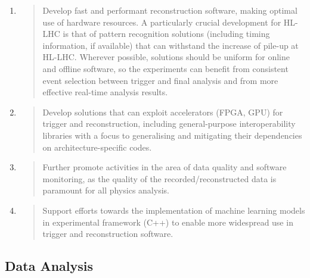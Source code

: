 \documentclass[11pt,a4paper]{article}
\begin{document}
\begin{enumerate}
\def\labelenumi{\arabic{enumi}.}
\item
  \begin{quote}
  Develop fast and performant reconstruction software, making optimal
  use of hardware resources. A particularly crucial development for
  HL-LHC is that of pattern recognition solutions (including timing
  information, if available) that can withstand the increase of pile-up
  at HL-LHC. Wherever possible, solutions should be uniform for online
  and offline software, so the experiments can benefit from consistent
  event selection between trigger and final analysis and from more
  effective real-time analysis results.
  \end{quote}
\item
  \begin{quote}
  Develop solutions that can exploit accelerators (FPGA, GPU) for
  trigger and reconstruction, including general-purpose interoperability
  libraries with a focus to generalising and mitigating their
  dependencies on architecture-specific codes.
  \end{quote}
\item
  \begin{quote}
  Further promote activities in the area of data quality and software
  monitoring, as the quality of the recorded/reconstructed data is
  paramount for all physics analysis.
  \end{quote}
\item
  \begin{quote}
  Support efforts towards the implementation of machine learning models
  in experimental framework (C++) to enable more widespread use in
  trigger and reconstruction software.
  \end{quote}
\end{enumerate}

\hypertarget{data-analysis-1}{%
\subsection{Data Analysis}\label{data-analysis-1}}
\end{document}
